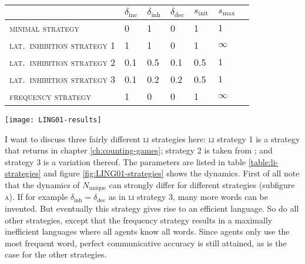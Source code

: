 \documentclass{../src/bcthesispart}
\begin{document}
\begin{SCtable}\sffamily\footnotesize\color{main}
	\begin{tabular}{@{}lllllll@{}}
		\toprule
		& $\delta_{\text{inc}}$ 
		&$\delta_{\text{inh}}$ 
		&$\delta_{\text{dec}}$ 
		&$s_{\text{init}}$ 
		&$s_{\text{max}}$\\\midrule
		\textsc{minimal strategy}		&0	&1	&0	&1 	&$1$\\
		\textsc{lat.~inhibition strategy 1}		&1	&1	&0	&1 	&$\infty$\\
		\textsc{lat.~inhibition strategy 2}		&0.1	 &0.5	&0.1	&0.5	&$1$\\
		\textsc{lat.~inhibition strategy 3}		&0.1	 &0.2	&0.2&0.5	&$1$\\
		\textsc{frequency strategy}		&1	&0	&0	&1	&$\infty$\\
		\bottomrule	
	\end{tabular}
	\caption{Parameter settings for four different strategies, whose behaviour is shown in figure \ref{fig:LING01-strategies}. Note that equivalent parametrisations also exist; see main text for details.
		\label{table:li-strategies}}
\end{SCtable}


\begin{SCfigure}
	\texttt{[image: LING01-results]}
	
	\caption{
	Comparison of the four naming game strategies in table \ref{table:li-strategies}. 
	The the unique word count and communicative success show that all strategies reach communicative success. 
	The stable language for the frequency strategy is not efficient.
	\label{fig:LING01-strategies}}
\end{SCfigure}




I want to discuss three fairly different \textsc{li} strategies here: 
\textsc{li} strategy 1 is a strategy that returns in chapter \ref{ch:counting-games}; 
strategy 2 is taken from \textcite{Wellens2012}; 
and strategy 3 is a variation thereof.
The parameters are listed in table \ref{table:li-strategies} and figure \ref{fig:LING01-strategies} shows the dynamics.
First of all note that the dynamics of $N_{\text{unique}}$ can strongly differ for different strategies (subfigure \textsc{a}).
If for example $\delta_{\text{inh}} = \delta_{\text{dec}}$ as in \textsc{li} strategy 3, many more words can be invented.
But eventually this strategy gives rise to an efficient language.
So do all other strategies, except that the frequency strategy results in a maximally inefficient languages where all agents know all words.
Since agents only use the most frequent word, perfect communicative accuracy is still attained, as is the case for the other strategies.
\end{document}
